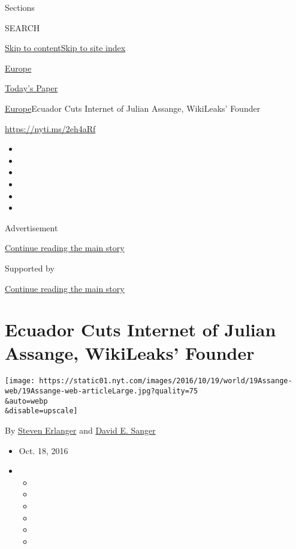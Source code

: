 Sections

SEARCH

\protect\hyperlink{site-content}{Skip to
content}\protect\hyperlink{site-index}{Skip to site index}

\href{https://www.nytimes.com/section/world/europe}{Europe}

\href{https://myaccount.nytimes.com/auth/login?response_type=cookie\&client_id=vi}{}

\href{https://www.nytimes.com/section/todayspaper}{Today's Paper}

\href{/section/world/europe}{Europe}\textbar{}Ecuador Cuts Internet of
Julian Assange, WikiLeaks' Founder

\url{https://nyti.ms/2eh4aRf}

\begin{itemize}
\item
\item
\item
\item
\item
\item
\end{itemize}

Advertisement

\protect\hyperlink{after-top}{Continue reading the main story}

Supported by

\protect\hyperlink{after-sponsor}{Continue reading the main story}

\hypertarget{ecuador-cuts-internet-of-julian-assange-wikileaks-founder}{%
\section{Ecuador Cuts Internet of Julian Assange, WikiLeaks'
Founder}\label{ecuador-cuts-internet-of-julian-assange-wikileaks-founder}}

\texttt{[image: https://static01.nyt.com/images/2016/10/19/world/19Assange-web/19Assange-web-articleLarge.jpg?quality=75\\\&auto=webp\\\&disable=upscale]}

By \href{http://www.nytimes.com/by/steven-erlanger}{Steven Erlanger} and
\href{http://www.nytimes.com/by/david-e-sanger}{David E. Sanger}

\begin{itemize}
\item
  Oct. 18, 2016
\item
  \begin{itemize}
  \item
  \item
  \item
  \item
  \item
  \item
  \end{itemize}
\end{itemize}

